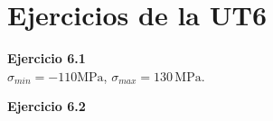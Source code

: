 %
%
%
%
%
%	
%	
%
%
%

\newpage


\section{Ejercicios de la UT6}

\textbf{Ejercicio 6.1}\\

 $\sigma_{min} = -110 \text{MPa}$, $\sigma_{max} = 130 \, \text{MPa}$.\newline


\textbf{Ejercicio 6.2}\\

